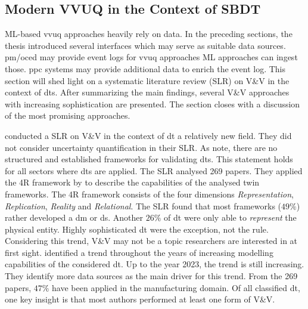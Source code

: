 \subsection{Modern VVUQ in the Context of SBDT}
\label{sec:vvuq-dt}
ML-based \gls{vvuq} approaches heavily rely on data. In the preceding sections, the thesis introduced several interfaces which may serve as suitable data sources. \gls{pm}/\gls{oced} may provide event logs for \gls{vvuq} approaches \textemdash ML approaches can ingest those. \gls{ppc} systems may provide additional data to enrich the event log. This section will shed light on a systematic literature review (SLR) on V\&V in the context of \gls{dt}s. After summarizing the main findings, several V\&V approaches with increasing sophistication are presented. The section closes with a discussion of the most promising approaches.

\Textcite{Bitencourt2023} conducted a SLR on V\&V in the context of \gls{dt} \textemdash a relatively new field. They did not consider uncertainty quantification in their SLR. As \textcite{hua2022validation} note, there are no structured and established frameworks for validating \gls{dt}s. This statement holds for all sectors where \gls{dt}s are applied. The SLR analysed 269 papers. They applied the 4R framework by \textcite{Osho2022jmsy} to describe the capabilities of the analysed twin frameworks. The 4R framework consists of the four dimensions \textit{Representation}, \textit{Replication}, \textit{Reality} and \textit{Relational}. The SLR found that most frameworks ($49\%$) rather developed a \gls{dm} or \gls{ds}. Another $26\%$ of \gls{dt} were only able to \textit{represent} the physical entity. Highly sophisticated \gls{dt} were the exception, not the rule. Considering this trend, V\&V may not be a topic researchers are interested in at first sight. \Textcite{Bitencourt2023} identified a trend throughout the years of increasing modelling capabilities of the considered \gls{dt}. Up to the year 2023, the trend is still increasing. They identify more data sources as the main driver for this trend. From the 269 papers, $47\%$ have been applied in the manufacturing domain. Of all classified \gls{dt}, one key insight is that most authors performed at least one form of V\&V.

